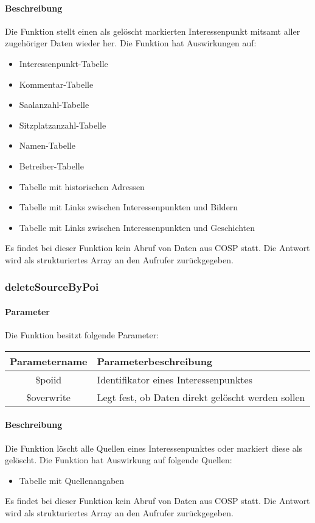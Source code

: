 \paragraph{Beschreibung} Die Funktion stellt einen als gelöscht markierten Interessenpunkt mitsamt aller zugehöriger Daten wieder her. Die Funktion hat Auswirkungen auf:
\begin{itemize}
	\item Interessenpunkt-Tabelle
	\item Kommentar-Tabelle
	\item Saalanzahl-Tabelle
	\item Sitzplatzanzahl-Tabelle
	\item Namen-Tabelle
	\item Betreiber-Tabelle
	\item Tabelle mit historischen Adressen
	\item Tabelle mit Links zwischen Interessenpunkten und Bildern
	\item Tabelle mit Links zwischen Interessenpunkten und Geschichten
\end{itemize}
Es findet bei dieser Funktion kein Abruf von Daten aus {\glqq COSP\grqq} statt. Die Antwort wird als strukturiertes Array an den Aufrufer zurückgegeben.
\subsubsection{deleteSourceByPoi}
\paragraph{Parameter} Die Funktion besitzt folgende Parameter:
\begin{table}[H]
	\begin{tabular}{|c|p{11cm}|}
		\hline
		\textbf{Parametername} & \textbf{Parameterbeschreibung} \\ \hline
		\$poiid     & Identifikator eines Interessenpunktes \\ \hline
		\$overwrite & Legt fest, ob Daten direkt gelöscht werden sollen \\ \hline
	\end{tabular}
\end{table}
\paragraph{Beschreibung} Die Funktion löscht alle Quellen eines Interessenpunktes oder markiert diese als gelöscht. Die Funktion hat Auswirkung auf folgende Quellen:
\begin{itemize}
	\item Tabelle mit Quellenangaben
\end{itemize}
Es findet bei dieser Funktion kein Abruf von Daten aus {\glqq COSP\grqq} statt. Die Antwort wird als strukturiertes Array an den Aufrufer zurückgegeben.
